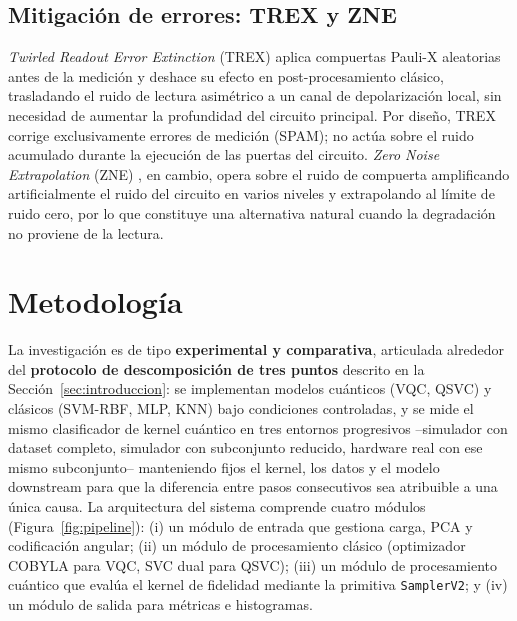 \documentclass[conference]{IEEEtran}
\begin{document}
\subsection{Mitigación de errores: TREX y ZNE}
\textit{Twirled Readout Error Extinction} (TREX) \cite{vandenberg2022} aplica compuertas Pauli-X aleatorias antes de la medición y deshace su efecto en post-procesamiento clásico, trasladando el ruido de lectura asimétrico a un canal de depolarización local, sin necesidad de aumentar la profundidad del circuito principal. Por diseño, TREX corrige exclusivamente errores de medición (SPAM); no actúa sobre el ruido acumulado durante la ejecución de las puertas del circuito. \textit{Zero Noise Extrapolation} (ZNE) \cite{temme2017}, en cambio, opera sobre el ruido de compuerta amplificando artificialmente el ruido del circuito en varios niveles y extrapolando al límite de ruido cero, por lo que constituye una alternativa natural cuando la degradación no proviene de la lectura.

\section{Metodología}
\label{sec:metodologia}

La investigación es de tipo \textbf{experimental y comparativa}, articulada alrededor del \textbf{protocolo de descomposición de tres puntos} descrito en la Sección~\ref{sec:introduccion}: se implementan modelos cuánticos (VQC, QSVC) y clásicos (SVM-RBF, MLP, KNN) bajo condiciones controladas, y se mide el mismo clasificador de kernel cuántico en tres entornos progresivos --simulador con dataset completo, simulador con subconjunto reducido, hardware real con ese mismo subconjunto-- manteniendo fijos el kernel, los datos y el modelo downstream para que la diferencia entre pasos consecutivos sea atribuible a una única causa. La arquitectura del sistema comprende cuatro módulos (Figura~\ref{fig:pipeline}): (i) un módulo de entrada que gestiona carga, PCA y codificación angular; (ii) un módulo de procesamiento clásico (optimizador COBYLA para VQC, SVC dual para QSVC); (iii) un módulo de procesamiento cuántico que evalúa el kernel de fidelidad mediante la primitiva \texttt{SamplerV2}; y (iv) un módulo de salida para métricas e histogramas.
\end{document}
